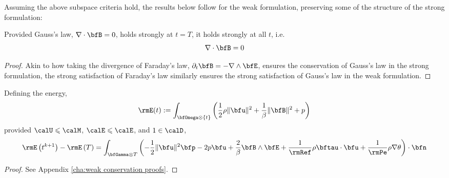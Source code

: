     \line

    Assuming the above subspace criteria hold, the results below follow for the weak formulation, preserving some of the structure of the strong formulation:
    
    \begin{theorem}
        Provided Gauss's law, $\nabla\cdot\bfB  =  0$, holds strongly at $t = T$, it holds strongly at all $t$, i.e.
        \begin{equation}
            \nabla\cdot\bfB  =  0
        \end{equation}
    \end{theorem}
    \begin{proof}
        Akin to how taking the divergence of Faraday's law, $\partial_{t}\bfB  =  - \nabla\wedge\bfE$, ensures the conservation of Gauss's law in the strong formulation, the strong satisfaction of Faraday's law similarly ensures the strong satisfaction of Gauss's law in the weak formulation.
    \end{proof}
    
    \begin{theorem}
        Defining the energy,
        \begin{equation}
            \rmE(t)  :=  \int_{\bfOmega\otimes\{t\}}\left(\frac{1}{2}\rho\|\bfu\|^{2} + \frac{1}{\beta}\|\bfB\|^{2} + p\right)
        \end{equation}
        provided $\calU  \leqslant  \calM$, $\calE 
         \leqslant  \calE$, and $1  \in  \calD$,
        \begin{equation}
            \rmE\left(t^{k + 1}\right) - \rmE\left(T\right)  =  \int_{\bfGamma\otimes T}\left(- \frac{1}{2}\|\bfu\|^{2}\bfp - 2p\bfu + \frac{2}{\beta}\bfB\wedge\bfE + \frac{1}{\rmRef}\rho\bftau\cdot\bfu + \frac{1}{\rmPe}\rho\nabla\theta\right)\cdot\bfn
        \end{equation}
    \end{theorem}
    \begin{proof}
        See Appendix \ref{cha:weak conservation proofs}.
    \end{proof}

